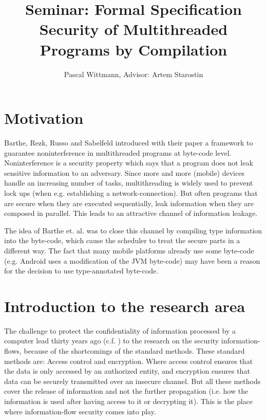 \documentclass[a4paper,10pt]{llncs}
\begin{document}
\title{{\normalsize Seminar: Formal Specification} \\[1ex]
  Security of Multithreaded Programs by Compilation\cite{Barthe07}}
\author{Pascal Wittmann, Advisor: Artem Starostin}

\maketitle


\section{Motivation}
\label{sec:motivation}
Barthe, Rezk, Russo and Sabelfeld introduced with
their paper \cite{Barthe07} a framework to guarantee
noninterference in multithreaded programs at byte-code
level. Noninterference is a security property which
says that a program does not leak sensitive information
to an adversary. Since more and more (mobile) devices handle
an increasing number of tasks, multithreading is widely used
to prevent lock ups (when e.g. establishing a
network-connection). But often programs that are secure when they
are executed sequentially, leak information when they are
composed in parallel. This leads to an attractive channel of
information leakage.

The idea of Barthe et. al. was to close this channel by compiling
type information into the byte-code, which cause the scheduler to
treat the secure parts in a different way. The fact that many mobile
platforms already use some byte-code (e.g. Android uses a modification
of the JVM byte-code) may have been a reason for the decision to use
type-annotated byte-code.

\section{Introduction to the research area}
\label{sec:introduction}
The challenge to protect the confidentiality of information processed by
a computer lead thirty years ago (c.f. \cite{Zdancewic04}) to the research
on the security information-flows, because of the shortcomings of the standard methods.
These standard methods are: Access control and encryption. Where
access control ensures that the data is only accessed by an authorized entity,
and encryption ensures that data can be securely transmitted over an insecure channel.
But all these methods cover the release of information and not the further
propagation (i.e. how the information is used after having access to it or decrypting
it). This is the place where information-flow security comes into play.
\end{document}
